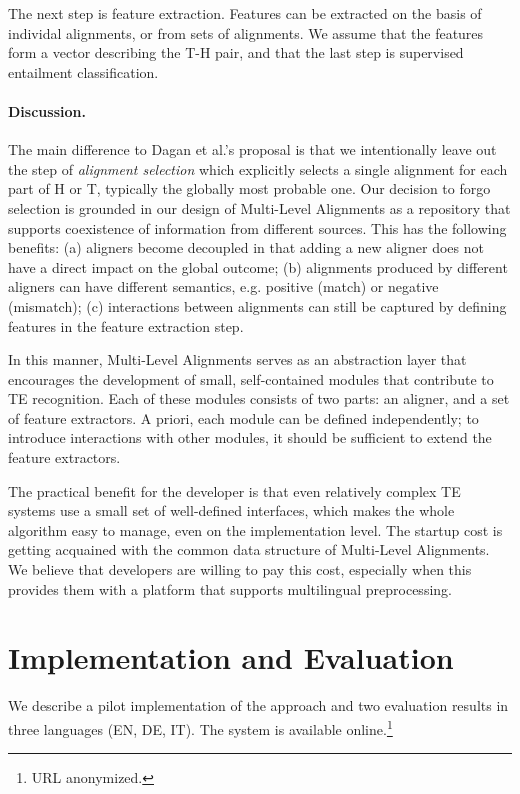 \documentclass[11pt,letterpaper]{article}
\begin{document}
The next step is feature extraction. Features can be extracted on the
basis of individal alignments, or from sets of alignments. We assume
that the features form a vector describing the T-H pair, and that the
last step is supervised entailment classification.

\paragraph{Discussion.} The main difference to Dagan et al.'s proposal
is that we intentionally leave out the step of {\em alignment
  selection} which explicitly selects a single alignment for each part
of H or T, typically the globally most probable one. Our decision to
forgo selection is grounded in our design of Multi-Level Alignments as
a repository that supports coexistence of information from different
sources. This has the following benefits: (a) aligners become
decoupled in that adding a new aligner does not have a direct impact
on the global outcome; (b) alignments produced by different aligners
can have different semantics, e.g. positive (match) or negative
(mismatch); (c) interactions between alignments can still be captured
by defining features in the feature extraction step.

In this manner, Multi-Level Alignments serves as an abstraction layer
that encourages the development of small, self-contained modules that
contribute to TE recognition. Each of these modules consists of two
parts: an aligner, and a set of feature extractors. A priori, each
module can be defined independently; to introduce interactions with
other modules, it should be sufficient to extend the feature
extractors.

The practical benefit for the developer is that even relatively
complex TE systems use a small set of well-defined interfaces, which
makes the whole algorithm easy to manage, even on the implementation
level. The startup cost is getting acquained with the common data
structure of Multi-Level Alignments. We believe that developers are
willing to pay this cost, especially when this provides them with a
platform that supports multilingual preprocessing.

\section{Implementation and Evaluation}
\label{sec:impl}

We describe a pilot implementation of the approach and two evaluation
results in three languages (EN, DE, IT). The system is available
online.\footnote{{URL} anonymized.} 
\end{document}
